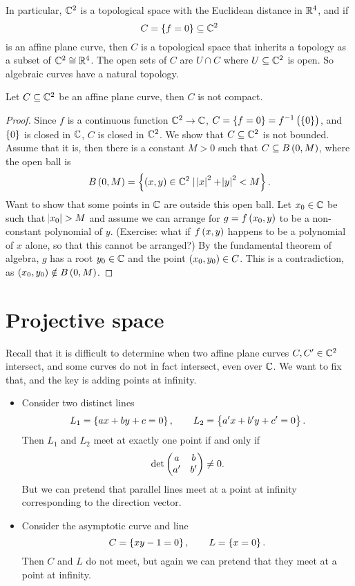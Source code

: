 In particular, $ \mathbb{C}^2 $ is a topological space with the Euclidean distance in $ \mathbb{R}^4 $, and if
$$ C = \cbr{f = 0} \subseteq \C^2 $$
is an affine plane curve, then $ C $ is a topological space that inherits a topology as a subset of $ \mathbb{C}^2 \cong \mathbb{R}^4 $. The open sets of $ C $ are $ U \cap C $ where $ U \subseteq \mathbb{C}^2 $ is open. So algebraic curves have a natural topology.

\begin{lemma}
Let $ C \subseteq \mathbb{C}^2 $ be an affine plane curve, then $ C $ is not compact.
\end{lemma}

\begin{proof}
Since $ f $ is a continuous function $ \mathbb{C}^2 \to \mathbb{C} $, $ C = \cbr{f = 0} = f^{-1}\br{\cbr{0}} $, and $ \cbr{0} $ is closed in $ \mathbb{C} $, $ C $ is closed in $ \mathbb{C}^2 $. We show that $ C \subseteq \mathbb{C}^2 $ is not bounded. Assume that it is, then there is a constant $ M > 0 $ such that $ C \subseteq B\br{0, M} $, where the open ball is
$$ B\br{0, M} = \cbr{\br{x, y} \in \C^2 \mid \abs{x}^2 + \abs{y}^2 < M}. $$
Want to show that some points in $ \mathbb{C} $ are outside this open ball. Let $ x_0 \in \mathbb{C} $ be such that $ \abs{x_0} > M $ and assume we can arrange for $ g = f\br{x_0, y} $ to be a non-constant polynomial of $ y $. (Exercise: what if $ f\br{x, y} $ happens to be a polynomial of $ x $ alone, so that this cannot be arranged?) By the fundamental theorem of algebra, $ g $ has a root $ y_0 \in \mathbb{C} $ and the point $ \br{x_0, y_0} \in C $. This is a contradiction, as $ \br{x_0, y_0} \notin B\br{0, M} $.
\end{proof}

\pagebreak

\section{Projective space}


Recall that it is difficult to determine when two affine plane curves $ C, C' \in \mathbb{C}^2 $ intersect, and some curves do not in fact intersect, even over $ \mathbb{C} $. We want to fix that, and the key is adding points at infinity.

\begin{example}
\hfill
\begin{itemize}
\item Consider two distinct lines
$$ L_1 = \cbr{ax + by + c = 0}, \qquad L_2 = \cbr{a'x + b'y + c' = 0}. $$
Then $ L_1 $ and $ L_2 $ meet at exactly one point if and only if
$$ \det\begin{pmatrix} a & b \\ a' & b' \end{pmatrix} \ne 0. $$
But we can pretend that parallel lines meet at a point at infinity corresponding to the direction vector.
\item Consider the asymptotic curve and line
$$ C = \cbr{xy - 1 = 0}, \qquad L = \cbr{x = 0}. $$
Then $ C $ and $ L $ do not meet, but again we can pretend that they meet at a point at infinity.
\end{itemize}
\end{example}

